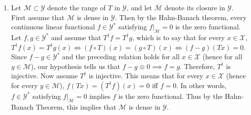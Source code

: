 \documentclass{article}
\begin{document}
\begin{enumerate}[itemsep =-2pt,label = (\alph{*})]
		\begin{align*}
			\begin{split}
				(T^{\dagger\dagger}\wh{x})(f) &= \wh{x} \circ T^{\dagger}f = \wh{x}(f \circ T) = f(Tx). 
			\end{split}
		\end{align*}
		On the other hand, since $Tx \in \mathscr{Y}$, $\wh{Tx} \in \wh{\mathscr{Y}}$ so that $\wh{Tx}(f) \coloneqq f(Tx)$. This means that 
		\begin{equation*}
			T^{\dagger\dagger}\wh{x} = \wh{Tx}. 
		\end{equation*}
		Since we identify $\wh{Tx}$ with $Tx$, $\wh{x}$ with $x$, and $x \in \mathscr{X}$ was arbitrary, we conclude that $T^{\dagger\dagger}|_{\mathscr{X}} = T$. 
		\item Let $\mathscr{M} \subset \mathscr{Y}$ denote the range of $T$ in $\mathscr{Y}$, and let $\overline{\mathscr{M}}$ denote its closure in $\mathscr{Y}$. First assume that $\mathscr{M}$ is dense in $\mathscr{Y}$. Then by the Hahn-Banach theorem, every continuous linear functional $f \in \mathscr{Y}^{\ast}$ satisfying $f|_{\mathscr{M}} = 0$ is the zero functional. Let $f, g \in \mathscr{Y}^{\ast}$ and assume that $T^{\dagger}f = T^{\dagger}g$, which is to say that for every $x \in \mathscr{X}$, $T^{\dagger}f(x) = T^{\dagger}g(x) \iff (f \circ T)(x) = (g \circ T)(x) \iff (f - g)(Tx) = 0$. Since $f - g \in \mathscr{Y}^{\ast}$ and the preceding relation holds for all $x \in \mathscr{X}$ (hence for all $y \in \mathscr{M}$), our hypothesis tells us that $f - g \equiv 0 \implies f =g$. Therefore, $T^{\dagger}$ is injective. Now assume $T^{\dagger}$ is injective. This means that for every $x \in \mathscr{X}$ (hence for every $y \in \mathscr{M}$), $f(Tx) = (T^{\dagger}f)(x) = 0$ iff $f = 0$. In other words, $f \in \mathscr{Y}^{\ast}$ satisfying $f|_{\mathscr{M}} = 0$ implies $f$ is the zero functional. Thus by the Hahn-Banach Theorem, this implies that $\mathscr{M}$ is dense in $\mathscr{Y}$. 

\end{enumerate}
\end{document}
